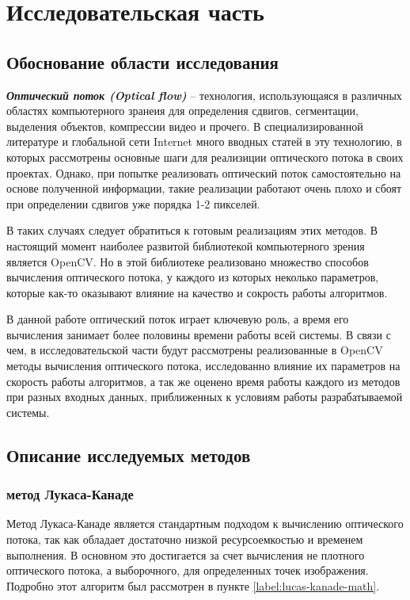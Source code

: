 \newpage
\section{Исследовательская часть}
\subsection{Обоснование области исследования}
\textit{\textbf{Оптический поток (Optical flow)}} – технология, использующаяся в различных областях компьютерного зранеия для определения сдвигов, сегментации, выделения объектов, компрессии видео и прочего. В специализированной литературе и глобальной сети Internet много вводных статей в эту технологию, в которых рассмотрены основные шаги для реализиции оптического потока в своих проектах. Однако, при попытке реализовать оптический поток самостоятельно на основе полученной информации, такие реализации  работают очень плохо и сбоят при определении сдвигов уже порядка 1-2 пикселей.

В таких случаях следует обратиться к готовым реализациям этих методов. В настоящий момент наиболее развитой библиотекой компьютерного зрения является OpenCV\cite{wikiOpenCV}. Но в этой библиотеке реализовано множество способов вычисления оптического потока, у каждого из которых неколько параметров, которые как-то оказывают влияние на качество и сокрость работы алгоритмов. 

В данной работе оптический поток играет ключевую роль, а время его вычисления занимает более половины времени работы всей системы. В связи с чем, в исследовательской части будут рассмотрены реализованные в OpenCV методы вычисления оптического потока, исследованно влияние их параметров на скорость работы алгоритмов, а так же оценено время работы каждого из методов при разных входных данных, приближенных к условиям работы разрабатываемой системы.

\subsection{Описание исследуемых методов}
\subsubsection{метод Лукаса-Канаде}
Метод Лукаса-Канаде является стандартным подходом к вычислению оптического потока, так как обладает достаточно низкой ресурсоемкостью и временем выполнения. В основном это достигается за счет вычисления не плотного оптического потока, а выборочного, для определенных точек изображения. Подробно этот алгоритм был рассмотрен в пункте \ref{label:lucas-kanade-math}. 

